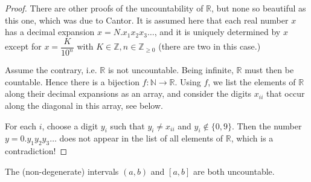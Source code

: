 \begin{proof}
  There are other proofs of the uncountability of $\mathbb{R}$, but none so beautiful as this one, which was due to Cantor.
  It is assumed here that each real number $x$ has a decimal expansion $x = N.x_1x_2x_3\dots$, and it is uniquely determined by $x$ except for $x = \dfrac{K}{10^n}$ with $K \in \mathbb{Z}, n \in \mathbb{Z}_{\geqslant 0}$ (there are two in this case.)
  
  Assume the contrary, i.e. $\mathbb{R}$ is not uncountable.
  Being infinite, $\mathbb{R}$ must then be countable.
  Hence there is a bijection $f : \mathbb{N} \to \mathbb{R}$.
  Using $f$, we list the elements of $\mathbb{R}$ along their decimal expansions as an array, and consider the digits $x_{ii}$ that occur along the diagonal in this array, see below.

  \begin{figure}[t]
    \centering
  \end{figure}

  For each $i$, choose a digit $y_i$ such that $y_i \ne x_{ii}$ and $y_i \notin \{0,9\}$.  Then the number $y = 0.y_1y_2y_3\dots$ does not appear in the list of all elements of $\mathbb{R}$, which is a contradiction!
\end{proof}

\begin{cor}
  The (non-degenerate) intervals $(a,b)$ and $[a,b]$ are both uncountable. 
\end{cor}
